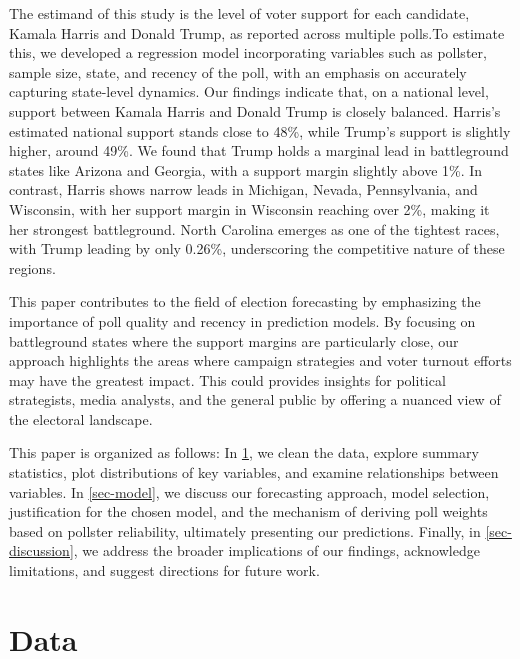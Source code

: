 \documentclass[
  letterpaper,
  DIV=11,
  numbers=noendperiod]{scrartcl}
\begin{document}
The estimand of this study is the level of voter support for each
candidate, Kamala Harris and Donald Trump, as reported across multiple
polls.To estimate this, we developed a regression model incorporating
variables such as pollster, sample size, state, and recency of the poll,
with an emphasis on accurately capturing state-level dynamics. Our
findings indicate that, on a national level, support between Kamala
Harris and Donald Trump is closely balanced. Harris's estimated national
support stands close to 48\%, while Trump's support is slightly higher,
around 49\%. We found that Trump holds a marginal lead in battleground
states like Arizona and Georgia, with a support margin slightly above
1\%. In contrast, Harris shows narrow leads in Michigan, Nevada,
Pennsylvania, and Wisconsin, with her support margin in Wisconsin
reaching over 2\%, making it her strongest battleground. North Carolina
emerges as one of the tightest races, with Trump leading by only 0.26\%,
underscoring the competitive nature of these regions.

This paper contributes to the field of election forecasting by
emphasizing the importance of poll quality and recency in prediction
models. By focusing on battleground states where the support margins are
particularly close, our approach highlights the areas where campaign
strategies and voter turnout efforts may have the greatest impact. This
could provides insights for political strategists, media analysts, and
the general public by offering a nuanced view of the electoral
landscape.

This paper is organized as follows: In \ref{sec-data}, we clean the
data, explore summary statistics, plot distributions of key variables,
and examine relationships between variables. In \ref{sec-model}, we
discuss our forecasting approach, model selection, justification for the
chosen model, and the mechanism of deriving poll weights based on
pollster reliability, ultimately presenting our predictions. Finally, in
\ref{sec-discussion}, we address the broader implications of our
findings, acknowledge limitations, and suggest directions for future
work.

\vspace{0.7cm}

\hypertarget{sec-data}{%
\section{Data}\label{sec-data}}

\vspace{0.7cm}
\end{document}
